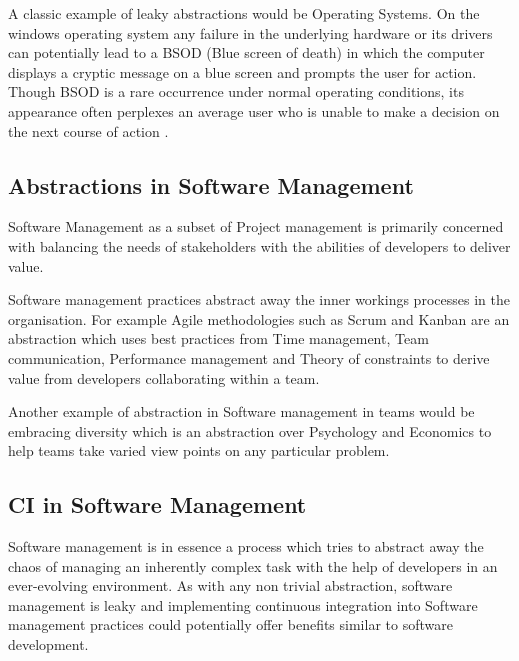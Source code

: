 A classic example of leaky abstractions would be Operating Systems. On the windows operating system any failure in the underlying hardware or its drivers can potentially lead to a BSOD (Blue screen of death) in which the computer displays a cryptic message on a blue screen and prompts the user for action. Though BSOD is a rare occurrence under normal operating conditions, its appearance often perplexes an average user who is unable to make a decision on the next course of action \cite{rosenberg_law_2007}. 

\subsection*{Abstractions in Software Management}

Software Management as a subset of Project management is primarily concerned with balancing the needs of stakeholders with the abilities of developers to deliver value.

Software management practices abstract away the inner workings processes in the organisation. For example Agile methodologies such as Scrum and Kanban are an abstraction which uses best practices from Time management, Team communication, Performance management and Theory of constraints to derive value from developers collaborating within a team. 

Another example of abstraction in Software management in teams would be embracing diversity which is an abstraction over Psychology and Economics to help teams take varied view points on any particular problem. 

\subsection*{CI in Software Management}

Software management is in essence a process which tries to abstract away the chaos of managing an inherently complex task with the help of developers in an ever-evolving environment. As with any non trivial abstraction, software management is leaky and implementing continuous integration into Software management practices could potentially offer benefits similar to software development.